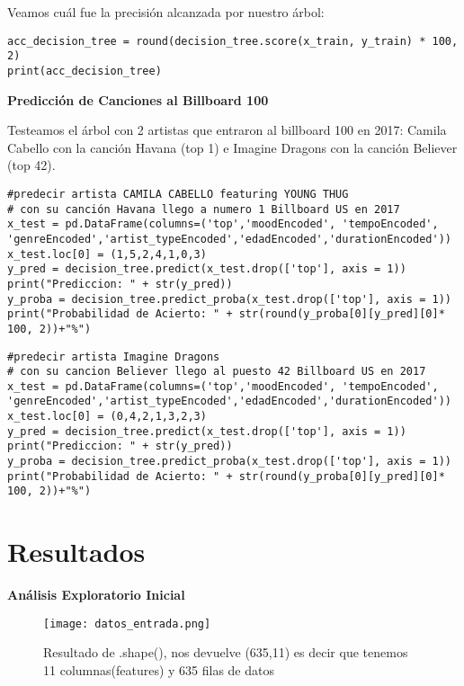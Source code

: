 \documentclass{article}
\begin{document}
Veamos cuál fue la precisión alcanzada por nuestro árbol:
\begin{lstlisting}
acc_decision_tree = round(decision_tree.score(x_train, y_train) * 100, 2)
print(acc_decision_tree)

\end{lstlisting}





\textbf{Predicción de Canciones al Billboard 100}

Testeamos el árbol con 2 artistas que entraron al billboard 100 en 2017: Camila Cabello con la canción Havana (top 1) e Imagine Dragons con la canción Believer (top 42).
\begin{lstlisting}   
#predecir artista CAMILA CABELLO featuring YOUNG THUG
# con su canción Havana llego a numero 1 Billboard US en 2017
x_test = pd.DataFrame(columns=('top','moodEncoded', 'tempoEncoded', 'genreEncoded','artist_typeEncoded','edadEncoded','durationEncoded'))
x_test.loc[0] = (1,5,2,4,1,0,3)
y_pred = decision_tree.predict(x_test.drop(['top'], axis = 1))
print("Prediccion: " + str(y_pred))
y_proba = decision_tree.predict_proba(x_test.drop(['top'], axis = 1))
print("Probabilidad de Acierto: " + str(round(y_proba[0][y_pred][0]* 100, 2))+"%")
\end{lstlisting}
\begin{lstlisting}
#predecir artista Imagine Dragons 
# con su cancion Believer llego al puesto 42 Billboard US en 2017
x_test = pd.DataFrame(columns=('top','moodEncoded', 'tempoEncoded', 'genreEncoded','artist_typeEncoded','edadEncoded','durationEncoded'))
x_test.loc[0] = (0,4,2,1,3,2,3)
y_pred = decision_tree.predict(x_test.drop(['top'], axis = 1))
print("Prediccion: " + str(y_pred))
y_proba = decision_tree.predict_proba(x_test.drop(['top'], axis = 1))
print("Probabilidad de Acierto: " + str(round(y_proba[0][y_pred][0]* 100, 2))+"%")
\end{lstlisting}







\section{Resultados}

\textbf{Análisis Exploratorio Inicial}

\begin{figure}[H]
\centering
\texttt{[image: datos\_entrada.png]}
\caption{ {\small Resultado de .shape(), nos devuelve (635,11) es decir que tenemos 11 columnas(features) y 635 filas de datos }}
\label{figura01}
\end{figure}
\end{document}
